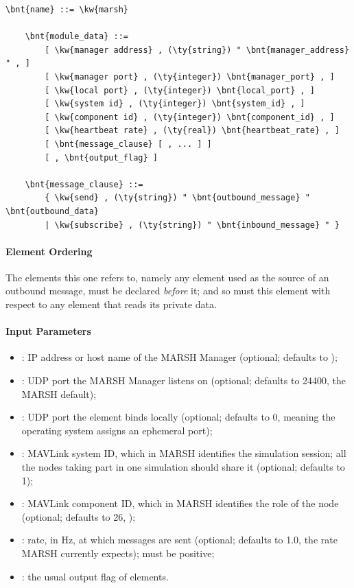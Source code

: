 \begin{Verbatim}[commandchars=\\\{\}]
    \bnt{name} ::= \kw{marsh}

    \bnt{module_data} ::=
        [ \kw{manager address} , (\ty{string}) " \bnt{manager_address} " , ]
        [ \kw{manager port} , (\ty{integer}) \bnt{manager_port} , ]
        [ \kw{local port} , (\ty{integer}) \bnt{local_port} , ]
        [ \kw{system id} , (\ty{integer}) \bnt{system_id} , ]
        [ \kw{component id} , (\ty{integer}) \bnt{component_id} , ]
        [ \kw{heartbeat rate} , (\ty{real}) \bnt{heartbeat_rate} , ]
        [ \bnt{message_clause} [ , ... ] ]
        [ , \bnt{output_flag} ]

    \bnt{message_clause} ::=
        { \kw{send} , (\ty{string}) " \bnt{outbound_message} " \bnt{outbound_data}
        | \kw{subscribe} , (\ty{string}) " \bnt{inbound_message} " }
\end{Verbatim}

\paragraph{Element Ordering}
The elements this one refers to, namely any 
element used as the source of an outbound message, must be declared
\emph{before} it; and so must this element with respect to any element that
reads its private data.

\paragraph{Input Parameters}
\begin{itemize}
    \item {}: IP address or host name of the MARSH
        Manager (optional; defaults to );
    \item {}: UDP port the MARSH Manager listens on
        (optional; defaults to 24400, the MARSH default);
    \item {}: UDP port the element binds locally (optional;
        defaults to 0, meaning the operating system assigns an ephemeral
        port);
    \item {}: MAVLink system ID, which in MARSH identifies the
        simulation session; all the nodes taking part in one simulation
        should share it (optional; defaults to 1);
    \item {}: MAVLink component ID, which in MARSH
        identifies the role of the node (optional; defaults to 26,
        );
    \item {}: rate, in Hz, at which 
        messages are sent (optional; defaults to 1.0, the rate MARSH
        currently expects); must be positive;
    \item {}: the usual output flag of elements.
\end{itemize}

